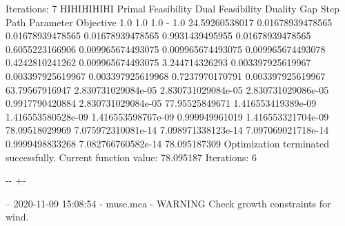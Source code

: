 \documentclass[letterpaper,10pt,english]{sphinxmanual}
\newlength\nbsphinxcodecellspacing
\begin{document}
{\begin{sphinxVerbatim}[commandchars=\\\{\}]
         Iterations: 7
HIHIHIHIHI
Primal Feasibility  Dual Feasibility    Duality Gap         Step             Path Parameter      Objective
1.0                 1.0                 1.0                 -                1.0                 24.59260538017
0.01678939478565    0.01678939478565    0.01678939478565    0.9931439495955  0.01678939478565    0.6055223166906
0.009965674493075   0.009965674493075   0.009965674493078   0.4242810241262  0.009965674493075   3.244714326293
0.003397925619967   0.003397925619967   0.003397925619968   0.7237970170791  0.003397925619967   63.79567916947
2.830731029084e-05  2.830731029084e-05  2.830731029086e-05  0.9917790420884  2.830731029084e-05  77.95525849671
1.416553419389e-09  1.416553580528e-09  1.416553598767e-09  0.999949961019   1.416553321704e-09  78.09518029969
7.075972310081e-14  7.098971338123e-14  7.097069021718e-14  0.9999498833268  7.082766760582e-14  78.095187309
Optimization terminated successfully.
         Current function value: 78.095187
         Iterations: 6
\end{sphinxVerbatim}
}

{

\kern-\sphinxverbatimsmallskipamount\kern-\baselineskip
\kern+\FrameHeightAdjust\kern-\fboxrule
\vspace{\nbsphinxcodecellspacing}

\begin{sphinxVerbatim}[commandchars=\\\{\}]
-- 2020-11-09 15:08:54 - muse.mca - WARNING
Check growth constraints for wind.

\end{sphinxVerbatim}
}
\end{document}
